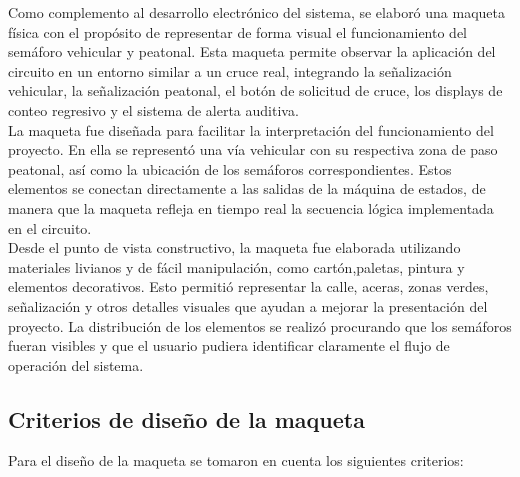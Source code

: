 \documentclass[12pt, journal, onecolumn]{IEEEtran}
\begin{document}
Como complemento al desarrollo electrónico del sistema, se elaboró una maqueta física con el propósito de representar de forma visual el funcionamiento del semáforo vehicular y peatonal. Esta maqueta permite observar la aplicación del circuito en un entorno similar a un cruce real, integrando la señalización vehicular, la señalización peatonal, el botón de solicitud de cruce, los displays de conteo regresivo y el sistema de alerta auditiva.\\

La maqueta fue diseñada para facilitar la interpretación del funcionamiento del proyecto. En ella se representó una vía vehicular con su respectiva zona de paso peatonal, así como la ubicación de los semáforos correspondientes. Estos elementos se conectan directamente a las salidas de la máquina de estados, de manera que la maqueta refleja en tiempo real la secuencia lógica implementada en el circuito.\\

Desde el punto de vista constructivo, la maqueta fue elaborada utilizando materiales livianos y de fácil manipulación, como cartón,paletas, pintura y elementos decorativos. Esto permitió representar la calle, aceras, zonas verdes, señalización y otros detalles visuales que ayudan a mejorar la presentación del proyecto. La distribución de los elementos se realizó procurando que los semáforos fueran visibles y que el usuario pudiera identificar claramente el flujo de operación del sistema.\\

\subsection{Criterios de diseño de la maqueta}

Para el diseño de la maqueta se tomaron en cuenta los siguientes criterios:
\end{document}
